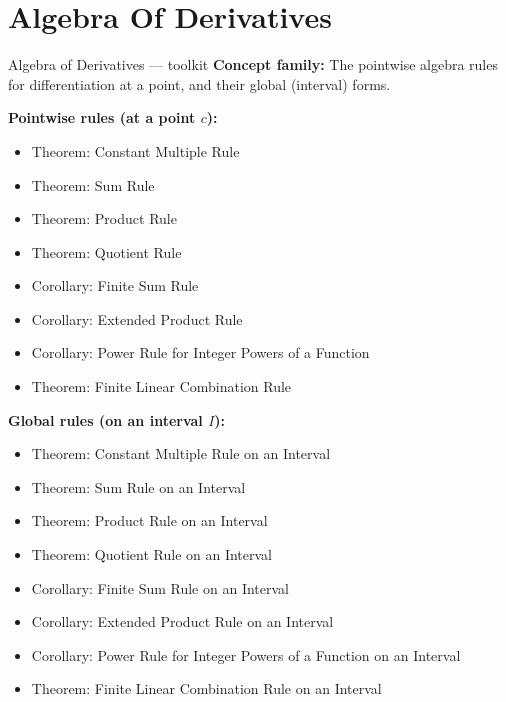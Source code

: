 \section{Algebra Of Derivatives}

\begin{toolkitbox}{Algebra of Derivatives --- toolkit}
\textbf{Concept family:} The pointwise algebra rules for differentiation at a point, and their global (interval) forms.

\medskip
\textbf{Pointwise rules (at a point $c$):}
\begin{itemize}
  \item Theorem: Constant Multiple Rule
  \item Theorem: Sum Rule
  \item Theorem: Product Rule
  \item Theorem: Quotient Rule
  \item Corollary: Finite Sum Rule
  \item Corollary: Extended Product Rule
  \item Corollary: Power Rule for Integer Powers of a Function
  \item Theorem: Finite Linear Combination Rule
\end{itemize}

\medskip
\textbf{Global rules (on an interval $I$):}
\begin{itemize}
  \item Theorem: Constant Multiple Rule on an Interval
  \item Theorem: Sum Rule on an Interval
  \item Theorem: Product Rule on an Interval
  \item Theorem: Quotient Rule on an Interval
  \item Corollary: Finite Sum Rule on an Interval
  \item Corollary: Extended Product Rule on an Interval
  \item Corollary: Power Rule for Integer Powers of a Function on an Interval
  \item Theorem: Finite Linear Combination Rule on an Interval
\end{itemize}
\end{toolkitbox}


